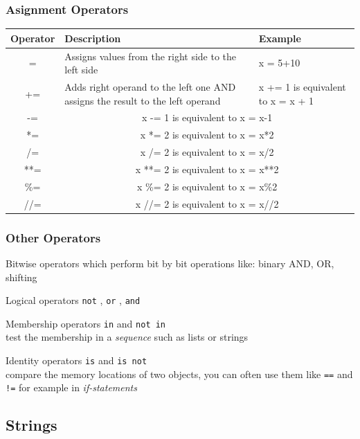\documentclass{beamer}
\begin{document}
\begin{frame}
\frametitle{Asignment Operators}
	\begin{tabular}{c|p{5cm}|p{3cm}}
		Operator & Description & Example  \\ \hline
		= & Assigns values from the right side to the left side & x = 5+10 \\
		+= & Adds right operand to the left one AND assigns the result to the left operand & x += 1 is equivalent to x = x + 1 \\ \hline	
		-= &  \multicolumn{2}{c}{x -= 1  is equivalent to x = x-1} \\
		*= &  \multicolumn{2}{c}{x *= 2 is equivalent to x = x*2} \\
		/= &  \multicolumn{2}{c}{x /= 2 is equivalent to x = x/2 }\\
		**= & \multicolumn{2}{c}{x **= 2 is equivalent to x = x**2} \\
		\%= &  \multicolumn{2}{c}{x \%= 2 is equivalent to x = x\%2 }\\
		//= &  \multicolumn{2}{c}{x //= 2 is equivalent to x = x//2 }\\ 	
 	\end{tabular}	
\end{frame}

\begin{frame}
\frametitle{Other Operators}
	\begin{alertblock}{Bitwise operators} 
		which perform bit by bit operations like: binary AND, OR, shifting
	\end{alertblock}
	\begin{alertblock}{Logical operators} 
		\texttt{not} , \texttt{or} , \texttt{and} \\
	\end{alertblock}
	\begin{alertblock} {Membership operators} 
		\texttt{in} and \texttt{not in} \\test the membership in a \textit{sequence} such as lists or strings
	\end{alertblock}
	\begin{alertblock}{Identity operators} 
		\texttt{is} and \texttt{is not} \\compare the memory locations of two objects, you can often use them like \texttt{==} and \texttt{!=}	for example in \textit{if-statements}
	\end{alertblock}
\end{frame}

\subsection{Strings}
\end{document}
